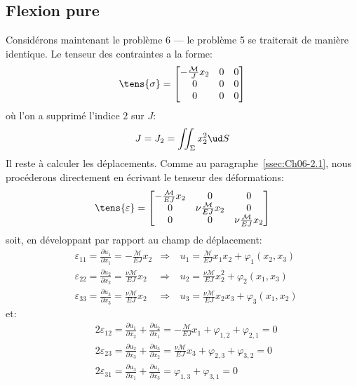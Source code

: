 \subsection{Flexion pure} \label{ssec:Ch07-1.3}
Considérons maintenant le problème 6 --- le problème 5 se traiterait de manière identique.
Le tenseur des contraintes a la forme:
\begin{equation}
    \tens{\sigma} = 
    \begin{bmatrix}
        -\frac{\mathcal{M}}{J}x_2 & 0 & 0 \\
        0 & 0 & 0 \\
        0 & 0 & 0
    \end{bmatrix}
    \label{eq:Ch07-025}
\end{equation}
où l'on a supprimé l'indice $2$ sur $J$:
\begin{equation}
    J=J_2 = \iint_{\Sigma} x_2^2 \ud S
    \label{eq:Ch07-026}
\end{equation}
Il reste à calculer les déplacements.
Comme au paragraphe~\ref{ssec:Ch06-2.1}, nous procéderons directement en écrivant le tenseur des déformations:
\begin{equation}
    \tens{\varepsilon} = 
    \begin{bmatrix}
        -\frac{\mathcal{M}}{EJ}x_2 & 0 & 0 \\
        0 & \nu\frac{\mathcal{M}}{EJ}x_2 & 0 \\
        0 & 0 & \nu\frac{\mathcal{M}}{EJ}x_2
    \end{bmatrix}
    \label{eq:Ch07-027}
\end{equation}
soit, en développant par rapport au champ de déplacement:
\begin{equation}
    \begin{aligned}
       & \varepsilon_{11} = \frac{\partial u_1}{\partial x_1} = -\frac{\mathcal{M}}{EJ}x_2 & \Rightarrow\ & u_1 = \frac{\mathcal{M}}{EJ}x_1x_2 + \varphi_1 \left( x_2,x_3 \right) \\
       & \varepsilon_{22} = \frac{\partial u_2}{\partial x_2} = \frac{\nu\mathcal{M}}{EJ}x_2 & \Rightarrow\ & u_2 = \frac{\nu\mathcal{M}}{EJ}x_2^2 + \varphi_2 \left( x_1,x_3 \right) \\
       & \varepsilon_{33} = \frac{\partial u_3}{\partial x_3} = \frac{\nu\mathcal{M}}{EJ}x_2 & \Rightarrow\ & u_3 = \frac{\nu\mathcal{M}}{EJ}x_2x_3 + \varphi_3 \left( x_1,x_2 \right)
    \end{aligned}
    \label{eq:Ch07-028}
\end{equation}
et:
\begin{equation}
    \begin{aligned}
       & 2 \varepsilon_{12} = \frac{\partial u_1}{\partial x_2} + \frac{\partial u_2}{\partial x_1} = - \frac{\mathcal{M}}{EJ}x_1 + \varphi_{1,2} + \varphi_{2,1} = 0 \\
       & 2 \varepsilon_{23} = \frac{\partial u_2}{\partial x_3} + \frac{\partial u_3}{\partial x_2} = \frac{\nu\mathcal{M}}{EJ}x_3 + \varphi_{2,3} + \varphi_{3,2} = 0 \\
      &  2 \varepsilon_{31} = \frac{\partial u_3}{\partial x_1} + \frac{\partial u_1}{\partial x_3} = \varphi_{1,3} + \varphi_{3,1} = 0
    \end{aligned}
    \label{eq:Ch07-029}
\end{equation}
